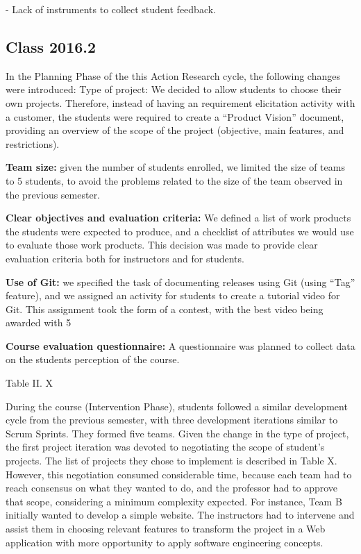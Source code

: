 -	Lack of instruments to collect student feedback.

\subsection{Class 2016.2}

In the Planning Phase of the this Action Research cycle, the following changes were introduced:
Type of project: We decided to allow students to choose their own projects. Therefore, instead of having an requirement elicitation activity with a customer, the students were required to create a “Product Vision” document, providing an overview of the scope of the project (objective, main features, and restrictions). 

\textbf{Team size:} given the number of students enrolled, we limited the size of teams to 5 students, to avoid the problems related to the size of the team observed in the previous semester.

\textbf{Clear objectives and evaluation criteria:} We defined a list of work products the students were expected to produce, and a checklist of attributes we would use to evaluate those work products. This decision was made to provide clear evaluation criteria both for instructors and for students.

\textbf{Use of Git:} we specified the task of documenting releases using Git (using “Tag” feature), and we assigned an activity for students to create a tutorial video for Git. This assignment took the form of a contest, with the best video being awarded with 5%

\textbf{Course evaluation questionnaire:} A questionnaire was planned to collect data on the students perception of the course.

Table II. X

During the course (Intervention Phase), students followed a similar development cycle from the previous semester, with three development iterations similar to Scrum Sprints. They formed five teams. Given the change in the type of project, the first project iteration was devoted to negotiating the scope of student’s projects. The list of projects they chose to implement is described in Table X. However, this negotiation consumed considerable time, because each team had to reach consensus on what they wanted to do, and the professor had to approve that scope, considering a minimum complexity expected. For instance, Team B initially wanted to develop a simple website. The instructors had to intervene and assist them in choosing relevant features to transform the project in a Web application with more opportunity to apply software engineering concepts. 

